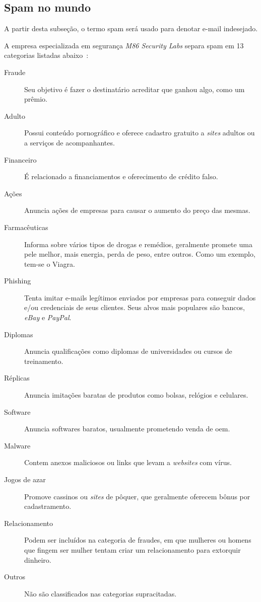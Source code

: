 \documentclass[a4paper,dvipdfm]{article}
\begin{document}
	\subsection{Spam no mundo}
		A partir desta subseção, o termo spam será usado para denotar e-mail indesejado.
		
		A empresa especializada em segurança \emph{M86 Security Labs} separa spam em 13 categorias listadas abaixo~\cite{spam:m86-type}:
		\begin{description}
			\item [Fraude] Seu objetivo é fazer o destinatário acreditar que ganhou algo, como um prêmio.
			\item [Adulto] Possui conteúdo pornográfico e oferece cadastro gratuito a \emph{sites} adultos ou a serviços de acompanhantes.
			\item [Financeiro] É relacionado a financiamentos e oferecimento de crédito falso.
			\item [Ações] Anuncia ações de empresas para causar o aumento do preço das mesmas.
			\item [Farmacêuticas] Informa sobre vários tipos de drogas e remédios, geralmente promete uma pele melhor, mais energia, perda de peso, entre outros. 
			Como um exemplo, tem-se o Viagra.
			\item [Phishing] Tenta imitar e-mails legítimos enviados por empresas para conseguir dados e/ou credenciais de seus clientes.
			Seus alvos mais populares são bancos, \emph{eBay} e \emph{PayPal}.
			\item [Diplomas] Anuncia qualificações como diplomas de universidades ou cursos de treinamento.
			\item [Réplicas] Anuncia imitações baratas de produtos como bolsas, relógios e celulares.
			\item [Software] Anuncia softwares baratos, usualmente prometendo venda de \gls{oem}.
			\item [Malware] Contem anexos maliciosos ou \glspl{link} que levam a \emph{websites} com vírus.
			\item [Jogos de azar] Promove cassinos ou \emph{sites} de pôquer, que geralmente oferecem bônus por cadastramento.
			\item [Relacionamento] Podem ser incluídos na categoria de fraudes, em que mulheres ou homens que fingem ser mulher tentam criar um relacionamento para extorquir dinheiro.
			\item [Outros] Não são classificados nas categorias supracitadas.
		\end{description}
\end{document}

